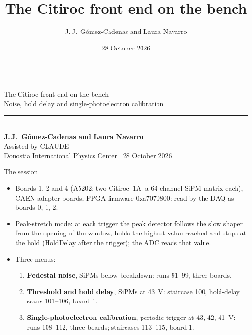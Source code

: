 \documentclass[10pt,aspectratio=169]{beamer}
\title{The Citiroc front end on the bench}
\author{J.\,J.~Gómez-Cadenas and Laura Navarro}
\date{28 October 2026}
\begin{document}
{
\begin{frame}[plain]
  \vspace*{1.6cm}
  \hspace*{0.6cm}\begin{minipage}{0.85\textwidth}
  {\color{white!75!azul}\scriptsize{}}\\[2ex]
  {\color{white}\playfair\fontsize{30}{34}\selectfont The Citiroc front end on the bench}\\[1.5ex]
  {\color{white!85!azul}\large Noise, hold delay and single-photoelectron calibration}\\[3ex]
  {\color{white!60!azul}\rule{1.8cm}{0.6pt}}\\[2ex]
  {\color{white}\large\bfseries J.\,J.~Gómez-Cadenas and Laura Navarro}\\[0.8ex]
  {\color{white!85!azul} Assisted by CLAUDE}\\[0.8ex]
  {\color{white!85!azul} Donostia International Physics Center \textperiodcentered\ 28 October 2026}
  \end{minipage}
\end{frame}
}

\begin{frame}{The session}
\begin{itemize}
\item Boards 1, 2 and 4 (A5202: two Citiroc~1A, a 64-channel SiPM matrix each), CAEN adapter
  boards, FPGA firmware 0xa7070800; read by the DAQ as boards 0, 1, 2.
\item Peak-stretch mode: at each trigger the peak detector follows the slow shaper from the
  opening of the window, holds the highest value reached and stops at the hold (HoldDelay
  after the trigger); the ADC reads that value.
\item Three menus:
  \begin{enumerate}
  \item \textbf{Pedestal noise}, SiPMs below breakdown: runs 91--99, three boards.
  \item \textbf{Threshold and hold delay}, SiPMs at 43~V: staircase 100, hold-delay scans
    101--106, board 1.
  \item \textbf{Single-photoelectron calibration}, periodic trigger at 43, 42, 41~V: runs
    108--112, three boards; staircases 113--115, board 1.
  \end{enumerate}
\end{itemize}
\end{frame}
\end{document}
